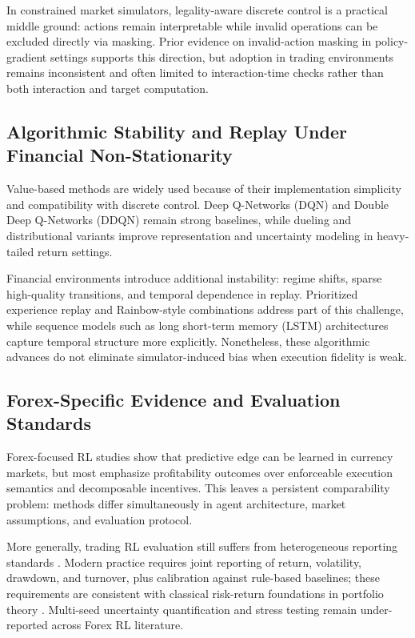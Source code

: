 In constrained market simulators, legality-aware discrete control is a practical middle ground: actions remain interpretable while invalid operations can be excluded directly via masking. Prior evidence on invalid-action masking in policy-gradient settings \citep{huang2020closer} supports this direction, but adoption in trading environments remains inconsistent and often limited to interaction-time checks rather than both interaction and target computation.

\subsection{Algorithmic Stability and Replay Under Financial Non-Stationarity}
Value-based methods are widely used because of their implementation simplicity and compatibility with discrete control. Deep Q-Networks (DQN) \citep{mnih2015humanlevel} and Double Deep Q-Networks (DDQN) \citep{hasselt2016deep} remain strong baselines, while dueling and distributional variants \citep{wang2016dueling,bellemare2017distributional} improve representation and uncertainty modeling in heavy-tailed return settings.

Financial environments introduce additional instability: regime shifts, sparse high-quality transitions, and temporal dependence in replay. Prioritized experience replay \citep{schaul2016prioritized} and Rainbow-style combinations \citep{hessel2018rainbow} address part of this challenge, while sequence models such as long short-term memory (LSTM) architectures \citep{fischer2018deep} capture temporal structure more explicitly. Nonetheless, these algorithmic advances do not eliminate simulator-induced bias when execution fidelity is weak.

\subsection{Forex-Specific Evidence and Evaluation Standards}
Forex-focused RL studies \citep{carapuco2018reinforcement,rundo2019deep,lucarelli2019deep} show that predictive edge can be learned in currency markets, but most emphasize profitability outcomes over enforceable execution semantics and decomposable incentives. This leaves a persistent comparability problem: methods differ simultaneously in agent architecture, market assumptions, and evaluation protocol.

More generally, trading RL evaluation still suffers from heterogeneous reporting standards \citep{zhang2020deep}. Modern practice requires joint reporting of return, volatility, drawdown, and turnover, plus calibration against rule-based baselines; these requirements are consistent with classical risk-return foundations in portfolio theory \citep{markowitz1952portfolio}. Multi-seed uncertainty quantification and stress testing remain under-reported across Forex RL literature.

